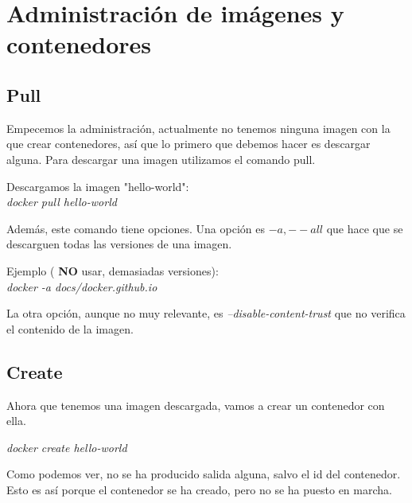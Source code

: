 \documentclass[]{article}
\begin{document}
\section{Administración de imágenes y contenedores}

\subsection{Pull}

Empecemos la administración, actualmente no tenemos ninguna imagen con la que crear contenedores, así que lo primero que debemos hacer es descargar alguna.
Para descargar una imagen utilizamos el comando pull.

\begin{center}
	
	Descargamos la imagen "hello-world":
	\vspace{1mm}
	\\
	\em docker pull hello-world
	
\end{center}

Además, este comando tiene opciones.
Una opción es $ -a,--all $ que hace que se descarguen todas las versiones de una imagen.

\begin{center}
Ejemplo  ( {\bf NO} usar, demasiadas versiones): 
\\
\vspace{1mm}
\em docker -a docs/docker.github.io

\end{center}

La otra opción, aunque no muy relevante, es  {\it --disable-content-trust }  que no verifica el contenido de la imagen.


\subsection{Create}

Ahora que tenemos una imagen descargada, vamos a crear un contenedor con ella.

\begin{center}

	\it docker create hello-world

\end{center}

Como podemos ver, no se ha producido salida alguna, salvo el id del contenedor. Esto es así porque el contenedor se ha creado, pero no se ha puesto en marcha.
\end{document}
